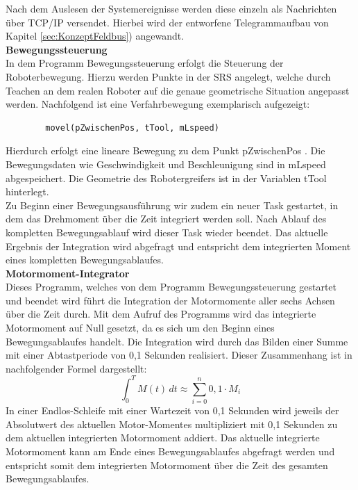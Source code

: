 \documentclass[ a4paper,
                oneside,
                toc=bibliography,
                toc=listof
                ]{scrbook}
\begin{document}
	Nach dem Auslesen der Systemereignisse werden diese einzeln als Nachrichten über TCP/IP versendet. Hierbei wird der entworfene Telegrammaufbau von Kapitel \ref{sec:KonzeptFeldbus}) angewandt.\\
	\textbf{Bewegungssteuerung}\\
	In dem Programm Bewegungssteuerung erfolgt die Steuerung der Roboterbewegung. Hierzu werden Punkte in der SRS angelegt, welche durch Teachen an dem realen Roboter auf die genaue geometrische Situation angepasst werden. Nachfolgend ist eine Verfahrbewegung exemplarisch aufgezeigt:
	\begin{lstlisting}
		movel(pZwischenPos, tTool, mLspeed)
	\end{lstlisting}
	Hierdurch erfolgt eine lineare Bewegung zu dem Punkt \glqq pZwischenPos \grqq{}. Die Bewegungsdaten wie Geschwindigkeit und Beschleunigung sind in \glqq mLspeed \grqq{} abgespeichert. Die Geometrie des Robotergreifers ist in der Variablen \glqq tTool \grqq{} hinterlegt.\\
	Zu Beginn einer Bewegungsausführung wir zudem ein neuer Task gestartet, in dem das Drehmoment über die Zeit integriert werden soll. Nach Ablauf des kompletten Bewegungsablauf wird dieser Task wieder beendet. Das aktuelle Ergebnis der Integration wird abgefragt und entspricht dem integrierten Moment eines kompletten Bewegungsablaufes.\\
	\textbf{Motormoment-Integrator}\\
	Dieses Programm, welches von dem Programm Bewegungssteuerung gestartet und beendet wird führt die Integration der Motormomente aller sechs Achsen über die Zeit durch. Mit dem Aufruf des Programms wird das integrierte Motormoment auf Null gesetzt, da es sich um den Beginn eines Bewegungsablaufes handelt. Die Integration wird durch das Bilden einer Summe mit einer Abtastperiode von 0,1 Sekunden realisiert. Dieser Zusammenhang ist in nachfolgender Formel dargestellt:
	\begin{equation}
		\int_{0}^{T} M(t) \, dt \approx \sum_{i=0}^{n} 0,1 \cdot M_i
	\end{equation}
	In einer Endlos-Schleife mit einer Wartezeit von 0,1 Sekunden wird jeweils der Absolutwert des aktuellen Motor-Momentes multipliziert mit 0,1 Sekunden zu dem aktuellen integrierten Motormoment addiert. Das aktuelle integrierte Motormoment kann am Ende eines Bewegungsablaufes abgefragt werden und entspricht somit dem integrierten Motormoment über die Zeit des gesamten Bewegungsablaufes.
\end{document}
